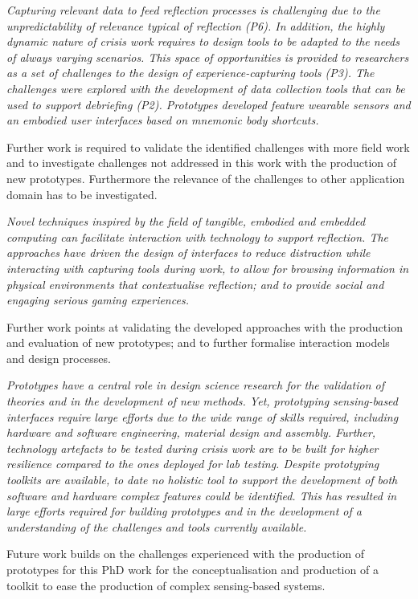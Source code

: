 \begin{framed}
\emph{Capturing relevant data to feed reflection processes is challenging due to the unpredictability of relevance typical of reflection (P6). In addition, the highly dynamic nature of crisis work requires to design tools to be adapted to the  needs of always varying scenarios. This space of opportunities is provided to researchers as a set of challenges to the design of experience-capturing tools (P3). The challenges were explored with the development of data collection tools that can be used to support debriefing (P2). Prototypes developed feature wearable sensors and an embodied user interfaces based on mnemonic body shortcuts.}
\par
Further work is required to validate the identified challenges with more field work and to investigate challenges not addressed in this work with the production of new prototypes. Furthermore the relevance of the challenges to other application domain has to be investigated. 
\end{framed}

\begin{framed}
\emph{Novel techniques inspired by the field of tangible, embodied and embedded computing can facilitate interaction with technology to support reflection. The approaches have driven the design of interfaces to reduce distraction while interacting with capturing tools during work, to allow for browsing information in physical environments that contextualise reflection; and to provide social and engaging serious gaming experiences.}
\par
Further work points at validating the developed approaches with the production and evaluation of new prototypes; and to further formalise interaction models and design processes.
\end{framed}

\begin{framed}
\emph{Prototypes have a central role in design science research for the validation of theories and in the development of new methods. Yet, prototyping sensing-based interfaces require large efforts due to the wide range of skills required, including hardware and software engineering, material design and assembly. Further, technology artefacts to be tested during crisis work are to be built for higher resilience compared to the ones deployed for lab testing. Despite prototyping toolkits are available, to date no holistic tool to support the development of both software and hardware complex features could be identified. This has resulted in large efforts required for building prototypes and in the development of a understanding of the challenges and tools currently available.}
\par
Future work builds on the challenges experienced with the production of prototypes for this PhD work for the conceptualisation and production of a toolkit to ease the production of complex sensing-based systems. 
\end{framed}

